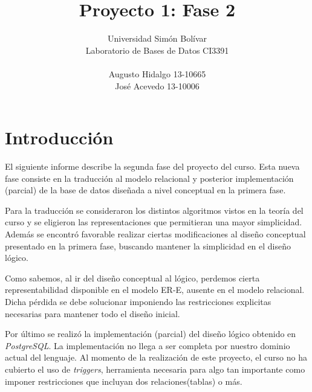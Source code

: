 \documentclass[]{report}
\title{\Huge\bfseries Proyecto 1: Fase 2}
\author{\Large Universidad Simón Bolívar\\Laboratorio de Bases de Datos CI3391\\ \\Augusto Hidalgo 13-10665\\José Acevedo 13-10006}
\begin{document}
	\maketitle
	
	\chapter*{Introducción}
	\begin{adjustwidth}{16pt}{16pt}\normalsize
		
		\hspace{1.5em}El siguiente informe describe la segunda fase del proyecto del curso. Esta nueva fase consiste en la traducción al modelo relacional y posterior implementación (parcial) de la base de datos diseñada a nivel conceptual en la primera fase. \\ \par
		
		Para la traducción se consideraron los distintos algoritmos vistos en la teoría del curso y se eligieron las representaciones que permitieran una mayor simplicidad. Además se encontró favorable realizar ciertas modificaciones al diseño conceptual presentado en la primera fase, buscando mantener la simplicidad en el diseño lógico. \\ \par
		
		Como sabemos, al ir del diseño conceptual al lógico, perdemos cierta representabilidad disponible en el modelo ER-E, ausente en el modelo relacional. Dicha pérdida se debe solucionar imponiendo las restricciones explicitas necesarias para mantener todo el diseño inicial. \\ \par
	
		Por último se realizó la implementación (parcial) del diseño lógico obtenido en \emph{PostgreSQL}. La implementación no llega a ser completa por nuestro dominio actual del lenguaje. Al momento de la realización de este proyecto, el curso no ha cubierto el uso de \emph{triggers}, herramienta necesaria para algo tan importante como imponer restricciones que incluyan dos relaciones(tablas) o más.
	
\end{adjustwidth}
	
\end{document}
